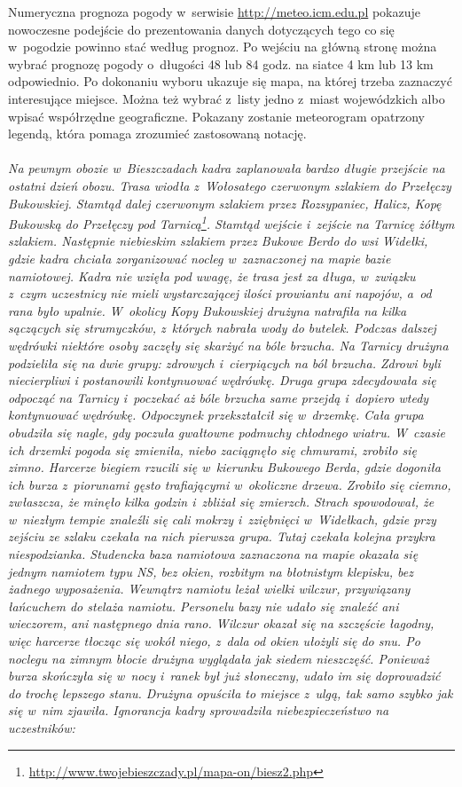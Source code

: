 \documentclass[a5paper,10pt,titlepage,twoside]{article}
\begin{document}
Numeryczna prognoza pogody w~serwisie \href{http://meteo.icm.edu.pl}{http://meteo.icm.edu.pl} pokazuje nowoczesne podejście do prezentowania danych dotyczących tego co się w~pogodzie powinno stać według prognoz. Po wejściu na główną stronę można wybrać prognozę pogody o~długości 48 lub 84 godz. na siatce 4 km lub 13 km odpowiednio. Po dokonaniu wyboru ukazuje się mapa, na której trzeba zaznaczyć interesujące miejsce. Można też wybrać z~listy jedno z~miast wojewódzkich albo wpisać współrzędne geograficzne. Pokazany zostanie meteorogram opatrzony legendą, która pomaga zrozumieć zastosowaną notację.
\\
\\
\small{
\emph{Na pewnym obozie w~Bieszczadach kadra zaplanowała bardzo długie przejście na ostatni dzień obozu. Trasa wiodła z~Wołosatego czerwonym szlakiem do Przełęczy Bukowskiej. Stamtąd dalej czerwonym szlakiem przez Rozsypaniec, Halicz, Kopę Bukowską do Przełęczy pod Tarnicą\footnote{\href{http://www.twojebieszczady.pl/mapa-on/biesz2.php}{http://www.twojebieszczady.pl/mapa-on/biesz2.php}}. Stamtąd wejście i~zejście na Tarnicę żółtym szlakiem. Następnie niebieskim szlakiem przez Bukowe Berdo do wsi Widełki, gdzie kadra chciała zorganizować nocleg w~zaznaczonej na mapie bazie namiotowej. Kadra nie wzięła pod uwagę, że trasa jest za długa, w~związku z~czym uczestnicy nie mieli wystarczającej ilości prowiantu ani napojów, a~od rana było upalnie. W~okolicy Kopy Bukowskiej drużyna natrafiła na kilka sączących się strumyczków, z~których nabrała wody do butelek. Podczas dalszej wędrówki niektóre osoby zaczęły się skarżyć na bóle brzucha. Na Tarnicy drużyna podzieliła się na dwie grupy: zdrowych i~cierpiących na ból brzucha. Zdrowi byli niecierpliwi i postanowili kontynuować wędrówkę. Druga grupa zdecydowała się odpocząć na Tarnicy i~poczekać aż bóle brzucha same przejdą i~dopiero wtedy kontynuować wędrówkę. Odpoczynek przekształcił się w~drzemkę. Cała grupa obudziła się nagle, gdy poczuła gwałtowne podmuchy chłodnego wiatru. W~czasie ich drzemki pogoda się zmieniła, niebo zaciągnęło się chmurami, zrobiło się zimno. Harcerze biegiem rzucili się w~kierunku Bukowego Berda, gdzie dogoniła ich burza z~piorunami gęsto trafiającymi w~okoliczne drzewa. Zrobiło się ciemno, zwłaszcza, że minęło kilka godzin i~zbliżał się zmierzch. Strach spowodował, że w~niezłym tempie znaleźli się cali mokrzy i~zziębnięci w~Widełkach, gdzie przy zejściu ze szlaku czekała na nich pierwsza grupa. Tutaj czekała kolejna przykra niespodzianka. Studencka baza namiotowa zaznaczona na mapie okazała się jednym namiotem typu NS, bez okien, rozbitym na błotnistym klepisku, bez żadnego wyposażenia. Wewnątrz namiotu leżał wielki wilczur, przywiązany łańcuchem do stelaża namiotu. Personelu bazy nie udało się znaleźć ani wieczorem, ani następnego dnia rano. Wilczur okazał się na szczęście łagodny, więc harcerze tłocząc się wokół niego, z~dala od okien ułożyli się do snu. Po noclegu na zimnym błocie drużyna wyglądała jak siedem nieszczęść. Ponieważ burza skończyła się w~nocy i~ranek był już słoneczny, udało im się doprowadzić do trochę lepszego stanu. Drużyna opuściła to miejsce z~ulgą, tak samo szybko jak się w~nim zjawiła. Ignorancja kadry sprowadziła niebezpieczeństwo na uczestników:
}}
\end{document}
